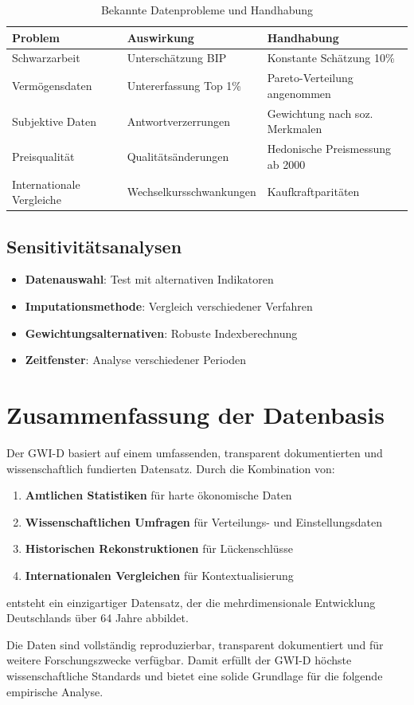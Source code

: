 \begin{table}[ht]
\centering
\begin{tabular}{lll}
\toprule
\textbf{Problem} & \textbf{Auswirkung} & \textbf{Handhabung} \\
\midrule
Schwarzarbeit & Unterschätzung BIP & Konstante Schätzung 10\% \\
Vermögensdaten & Untererfassung Top 1\% & Pareto-Verteilung angenommen \\
Subjektive Daten & Antwortverzerrungen & Gewichtung nach soz. Merkmalen \\
Preisqualität & Qualitätsänderungen & Hedonische Preismessung ab 2000 \\
Internationale Vergleiche & Wechselkursschwankungen & Kaufkraftparitäten \\
\bottomrule
\end{tabular}
\caption{Bekannte Datenprobleme und Handhabung}
\label{tab:datenprobleme}
\end{table}

\subsection{Sensitivitätsanalysen}

\begin{itemize}
\item \textbf{Datenauswahl}: Test mit alternativen Indikatoren
\item \textbf{Imputationsmethode}: Vergleich verschiedener Verfahren
\item \textbf{Gewichtungsalternativen}: Robuste Indexberechnung
\item \textbf{Zeitfenster}: Analyse verschiedener Perioden
\end{itemize}

\section{Zusammenfassung der Datenbasis}

Der GWI-D basiert auf einem umfassenden, transparent dokumentierten und wissenschaftlich fundierten Datensatz. Durch die Kombination von:

\begin{enumerate}
\item \textbf{Amtlichen Statistiken} für harte ökonomische Daten
\item \textbf{Wissenschaftlichen Umfragen} für Verteilungs- und Einstellungsdaten
\item \textbf{Historischen Rekonstruktionen} für Lückenschlüsse
\item \textbf{Internationalen Vergleichen} für Kontextualisierung
\end{enumerate}

entsteht ein einzigartiger Datensatz, der die mehrdimensionale Entwicklung Deutschlands über 64 Jahre abbildet.

Die Daten sind vollständig reproduzierbar, transparent dokumentiert und für weitere Forschungszwecke verfügbar. Damit erfüllt der GWI-D höchste wissenschaftliche Standards und bietet eine solide Grundlage für die folgende empirische Analyse.
